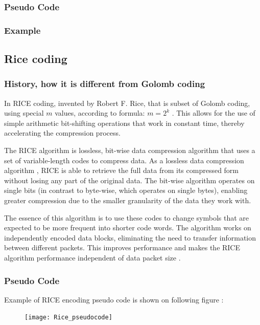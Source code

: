 \documentclass[licencjacka,en]{pracamgr}
\begin{document}
\subsubsection{Pseudo Code}

\subsubsection{Example}

\subsection{Rice coding}
\subsubsection{History, how it is different from Golomb coding}
In RICE coding, invented by Robert F. Rice, that is subset of Golomb coding, using special $m$ values, according to formula: $m = 2^k$ \cite{golomb-coding-work}. This allows for the use of simple arithmetic bit-shifting operations that work in constant time, thereby accelerating the compression process.

The RICE algorithm is lossless, bit-wise data compression algorithm that uses a set of variable-length codes to compress data. As a lossless data compression algorithm \cite{rice-basics}, RICE is able to retrieve the full data from its compressed form without losing any part of the original data. The bit-wise algorithm operates on single bits (in contrast to byte-wise, which operates on single bytes), enabling greater compression due to the smaller granularity of the data they work with.

The essence of this algorithm is to use these codes to change symbols that are expected to be more frequent into shorter code words. The algorithm works on independently encoded data blocks, eliminating the need to transfer information between different packets. This improves performance and makes the RICE algorithm performance independent of data packet size \cite{rice-codes}.


\subsubsection{Pseudo Code}
Example of RICE encoding pseudo code is shown on following figure \cite{golomb-wikipedia}: \\
\begin{figure}[h]
\centering
\texttt{[image: Rice\_pseudocode]}
\end{figure}
\end{document}
